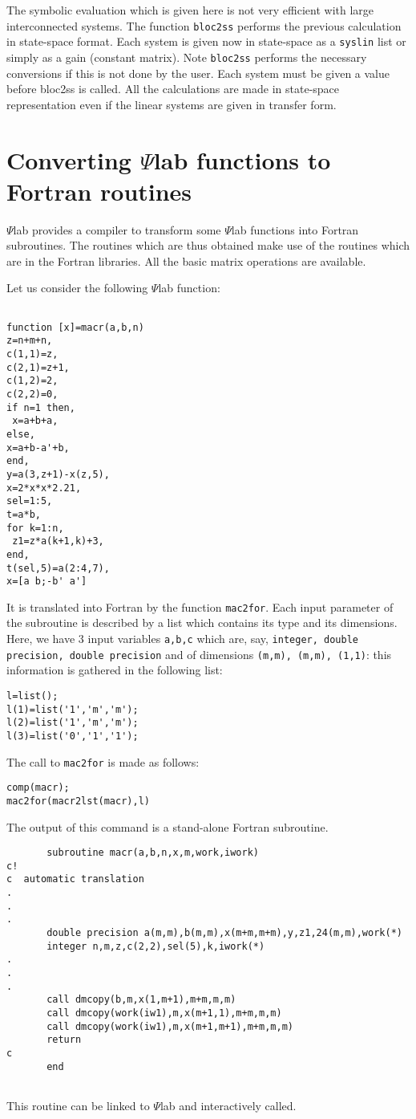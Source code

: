 The symbolic evaluation which is given here is not very efficient
with large interconnected systems. The function {\tt bloc2ss}
performs the previous calculation in state-space format.
Each system is given now in state-space 
as a {\tt syslin} list or simply as a gain (constant matrix). 
Note {\tt bloc2ss} performs the necessary conversions if this 
is not done by the user. Each system must be given a value before
bloc2ss is called. All the calculations are made in state-space
representation even if the linear systems are given in transfer form.

\section{Converting $\Psi$lab functions to Fortran routines}

$\Psi$lab provides a compiler to transform some $\Psi$lab functions
into Fortran subroutines. The routines which are thus obtained
make use of the routines which are in the Fortran libraries.
All the basic matrix operations are available.

Let us consider the following $\Psi$lab function:
\begin{verbatim}

function [x]=macr(a,b,n)
z=n+m+n,
c(1,1)=z,
c(2,1)=z+1,
c(1,2)=2,
c(2,2)=0,
if n=1 then,
 x=a+b+a,
else,
x=a+b-a'+b,
end,
y=a(3,z+1)-x(z,5),
x=2*x*x*2.21,
sel=1:5,
t=a*b,
for k=1:n,
 z1=z*a(k+1,k)+3,
end,
t(sel,5)=a(2:4,7),
x=[a b;-b' a']

\end{verbatim}

It is translated into Fortran by the function {\tt mac2for}.
Each input parameter of the subroutine is described by a list
which contains its type and its dimensions. Here, we have 3
input variables {\tt a,b,c} which are, say, {\tt integer,
double precision, double precision} and of dimensions
{\tt (m,m), (m,m), (1,1)}: this information is gathered
in the following list:
\begin{verbatim}
l=list();
l(1)=list('1','m','m');
l(2)=list('1','m','m');
l(3)=list('0','1','1');
\end{verbatim}
The call to {\tt mac2for} is made as follows:
\begin{verbatim}
comp(macr);
mac2for(macr2lst(macr),l)
\end{verbatim}
The output of this command is a stand-alone Fortran subroutine.
\begin{verbatim}
       subroutine macr(a,b,n,x,m,work,iwork)
c!
c  automatic translation
.
.
.
       double precision a(m,m),b(m,m),x(m+m,m+m),y,z1,24(m,m),work(*)
       integer n,m,z,c(2,2),sel(5),k,iwork(*)
.
.
.      
       call dmcopy(b,m,x(1,m+1),m+m,m,m)
       call dmcopy(work(iw1),m,x(m+1,1),m+m,m,m)
       call dmcopy(work(iw1),m,x(m+1,m+1),m+m,m,m)
       return
c
       end


\end{verbatim}
This routine can be linked to $\Psi$lab and interactively called.

